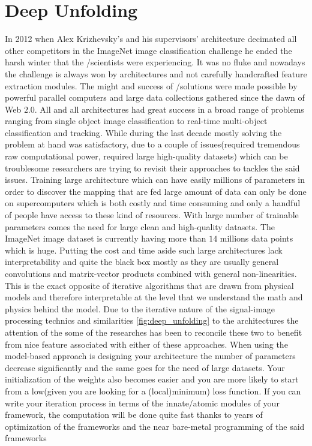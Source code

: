 \chapter{Deep Unfolding}


In 2012 when Alex Krizhevsky's and his supervisors' \dl architecture \cite{Krizhevsky2017} decimated all other competitors in the 
ImageNet \cite{Vision2021} image classification challenge\cite{Vision} 
he ended the harsh winter that the \ml/\ai scientists were experiencing. It was no fluke and nowadays the challenge is always won by \dl 
architectures \cite{Szegedy2014}\cite{He2015}\cite{Simonyan2014} and not carefully handcrafted feature extraction modules. The  might and success of
 \ml/\dl solutions were made possible by powerful parallel 
computers \cite{Meuer} and large data collections gathered since the dawn of Web $2.0$. All and all \dl architectures had great success in a broad
 range of problems ranging from single object image classification \cite{Rawat2017} to real-time multi-object classification and tracking\cite{Luo2021}.
While during the last decade mostly solving the problem at hand was satisfactory, due to a couple of issues(required tremendous raw computational
 power, required large high-quality datasets) which can be troublesome researchers are trying to revisit their approaches 
to tackles the said issues. Training large architecture which can have easily millions of parameters in order to discover the mapping that are fed
 large amount of data can 
only be done on supercomputers which is both costly and time consuming and only a handful of people have access to these kind of resources. With large number of trainable
 parameters comes the need for large clean and high-quality datasets. The ImageNet\cite{Vision2021} image dataset is currently having more than $14$ millions data points which is
  huge. Putting the cost and time aside  
such large architectures lack interpretability and quite the black box mostly as they are usually general convolutions and matrix-vector products combined with general non-linearities. 
This is the exact opposite of iterative algorithms that are drawn from physical models and therefore interpretable at the level that we understand the math and physics behind the model. 
Due to the iterative nature of the signal-image processing technics and similarities \cref{fig:deep_unfolding} to the \dl architectures the attention of the some of the 
researches has been to reconcile these two to benefit from nice feature associated with either of these approaches. When using the model-based 
approach is designing your architecture the number of parameters decrease significantly and the same goes for the need of large datasets. Your initialization of the weights also 
becomes easier and you are more likely to start from a low(given you are looking for a (local)minimum) loss function. If you can write your iteration process in terms of the innate/atomic 
modules of your \dl framework\cite{Google2023}\cite{Chollet2023}\cite{LFMAI2023}, the computation will be done quite fast thanks to years of optimization of the frameworks\cite{Google2023}\cite{Chollet2023}\cite{LFMAI2023} and the near bare-metal programming of the said frameworks 

